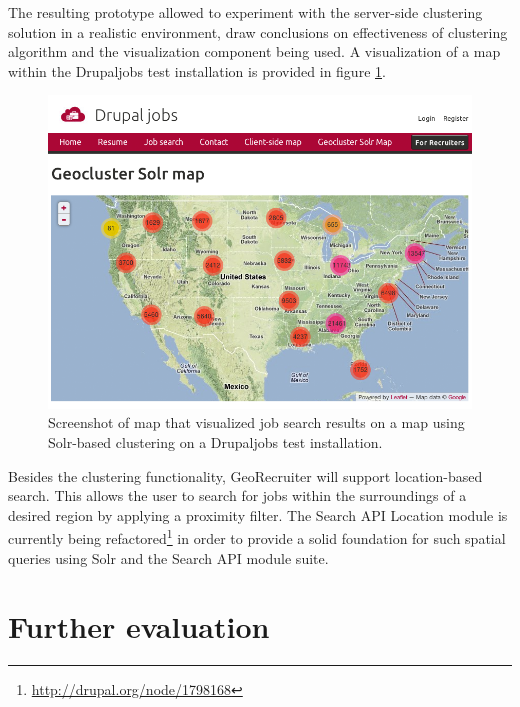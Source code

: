 The resulting prototype allowed to experiment with the server-side clustering solution in a realistic environment, draw conclusions on effectiveness of clustering algorithm and the visualization component being used. A visualization of a map within the Drupaljobs test installation is provided in figure \ref{fig:drupaljobs-geocluster-solr}.

\begin{figure}[h]
  \begin{center}
    \includegraphics[width=1\textwidth]{figures/drupaljobs_geocluster_solr.png}
    \caption{Screenshot of map that visualized job search results on a map using Solr-based clustering on a Drupaljobs test installation.}
    \label{fig:drupaljobs-geocluster-solr}
  \end{center}
\end{figure}


Besides the clustering functionality, GeoRecruiter will support location-based search. This allows the user to search for jobs within the surroundings of a desired region by applying a proximity filter. The Search API Location module is currently being refactored\footnote{\url{http://drupal.org/node/1798168}} in order to provide a solid foundation for such spatial queries using Solr and the Search API module suite.


\section{Further evaluation}

